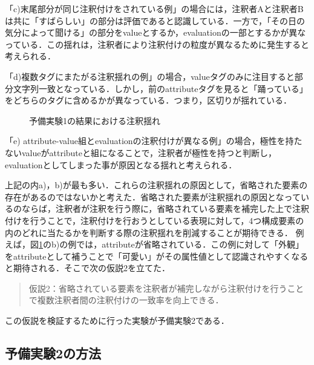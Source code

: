 \documentclass[japanese]{jnlp_1.4}
\begin{document}
「c)末尾部分が同じ注釈付けをされている例」の場合には，注釈者Aと注釈者Bは共に「すばらしい」の部分は評価であると認識している．一方で，「その日の気分によって聞ける」の部分をvalueとするか，evaluationの一部とするかが異なっている．この揺れは，注釈者により注釈付けの粒度が異なるために発生すると考えられる．

「d)複数タグにまたがる注釈揺れの例」の場合，valueタグのみに注目すると部分文字列一致となっている．しかし，前のattributeタグを見ると「踊っている」をどちらのタグに含めるかが異なっている．つまり，区切りが揺れている．

\begin{figure}[t]

\caption{予備実験1の結果における注釈揺れ}
\label{fig:予備実験1の結果における注釈揺れ}
\end{figure}

「e) attribute-value組とevaluationの注釈付けが異なる例」の場合，極性を持たないvalueがattributeと組になることで，注釈者が極性を持つと判断し，evaluationとしてしまった事が原因となる揺れと考えられる．

上記の内a)，b)が最も多い．これらの注釈揺れの原因として，省略された要素の存在があるのではないかと考えた．省略された要素が注釈揺れの原因となっているのならば，注釈者が注釈を行う際に，省略されている要素を補完した上で注釈付けを行うことで，注釈付けを行おうとしている表現に対して，4つ構成要素の内のどれに当たるかを判断する際の注釈揺れを削減することが期待できる．
例えば，図\ref{fig:予備実験1の結果における注釈揺れ}のb)の例では，attributeが省略されている．この例に対して「外観」をattributeとして補うことで「可愛い」がその属性値として認識されやすくなると期待される．そこで次の仮説2を立てた．

\vspace{0.5\baselineskip}
\begin{quote}
仮説2：省略されている要素を注釈者が補完しながら注釈付けを行うことで複数注釈者間の注釈付けの一致率を向上できる．
\end{quote}
\vspace{0.5\baselineskip}

この仮説を検証するために行った実験が予備実験2である．


\subsection{予備実験2の方法}
\end{document}

